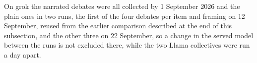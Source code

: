 On grok the narrated debates were all collected by 1 September 2026 and the
plain ones in two runs, the first of the four debates per item and framing
on 12 September, reused from the earlier comparison described at the end of
this subsection, and the other three on 22 September, so a change in the
served model between the runs is not excluded there, while the two Llama
collectives were run a day apart.

